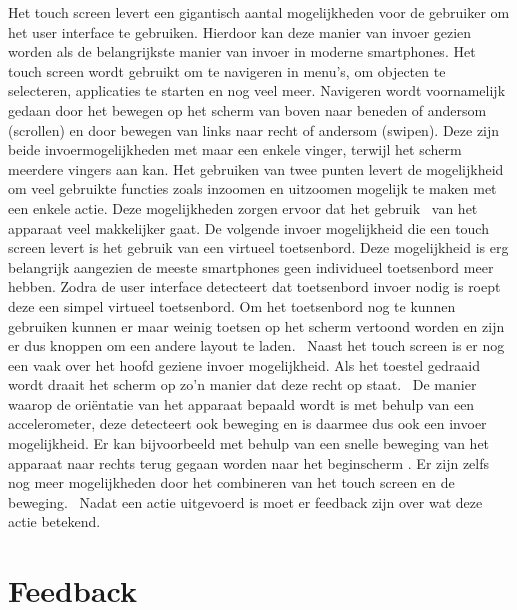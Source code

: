 Het touch screen levert een gigantisch aantal mogelijkheden voor de gebruiker om het user interface te gebruiken. Hierdoor kan deze manier van invoer gezien worden als de belangrijkste manier van invoer in moderne smartphones. Het touch screen wordt gebruikt om te navigeren in menu's, om objecten te selecteren, applicaties te starten en nog veel meer. Navigeren wordt voornamelijk gedaan door het bewegen op het scherm van boven naar beneden of andersom (scrollen) en door bewegen van links naar recht of andersom (swipen). Deze zijn beide invoermogelijkheden met maar een enkele vinger, terwijl het scherm meerdere vingers aan kan. Het gebruiken van twee punten levert de mogelijkheid om veel gebruikte functies zoals inzoomen en uitzoomen mogelijk te maken met een enkele actie. Deze mogelijkheden zorgen ervoor dat het gebruik  van het apparaat veel makkelijker gaat. De volgende invoer mogelijkheid die een touch screen levert is het gebruik van een virtueel toetsenbord. Deze mogelijkheid is erg belangrijk aangezien de meeste smartphones geen individueel toetsenbord meer hebben. Zodra de user interface detecteert dat toetsenbord invoer nodig is roept deze een simpel virtueel toetsenbord. Om het toetsenbord nog te kunnen gebruiken kunnen er maar weinig toetsen op het scherm vertoond worden en zijn er dus knoppen om een andere layout te laden.  Naast het touch screen is er nog een vaak over het hoofd geziene invoer mogelijkheid. Als het toestel gedraaid wordt draait het scherm op zo’n manier dat deze recht op staat.  De manier waarop de oriëntatie van het apparaat bepaald wordt is met behulp van een accelerometer, deze detecteert ook beweging en is daarmee dus ook een invoer mogelijkheid. Er kan bijvoorbeeld met behulp van een snelle beweging van het apparaat naar rechts terug gegaan worden naar het beginscherm . Er zijn zelfs nog meer mogelijkheden door het combineren van het touch screen en de beweging.  Nadat een actie uitgevoerd is moet er feedback zijn over wat deze actie betekend. 

\section{Feedback}

